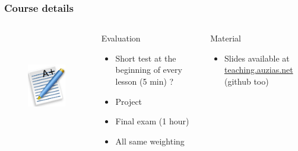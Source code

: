 \documentclass[]{beamer}
\begin{document}
  \begin{frame}
    \frametitle{Course details}
    \begin{columns}
        \begin{figure}[t]
          \centering
          \includegraphics[height=4cm]{./imgs/grade.pdf}
          \label{fig:marks}
        \end{figure}
        \begin{block}{Evaluation}
          \begin{itemize}
            \item Short test at the beginning of every lesson (5 min) ?
            \item Project
            \item Final exam (1 hour)
            \item All same weighting
          \end{itemize}
        \end{block}
        \begin{block}{Material}
          \begin{itemize}
            \item Slides available at \color{blue}\href{http://teaching.auzias.net}{teaching.auzias.net} \color{black} (github too)
          \end{itemize}
        \end{block}
    \end{columns}
  \end{frame}









%    
\end{document}
